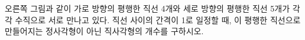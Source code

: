 \noindent\begin{minipage}[t]{0.58\linewidth}\vspace{0pt}\raggedright 오른쪽 그림과 같이 가로 방향의 평행한 직선 4개와 세로 방향의 평행한 직선 5개가 각각 수직으로 서로 만나고 있다. 직선 사이의 간격이 1로 일정할 때, 이 평행한 직선으로 만들어지는 정사각형이 아닌 직사각형의 개수를 구하시오.\end{minipage}\hfill\begin{minipage}[t]{0.4\linewidth}\vspace{0pt}\centering \resizebox{\ifdim\width>\linewidth\linewidth\else\width\fi}{!}{}\end{minipage}\par
